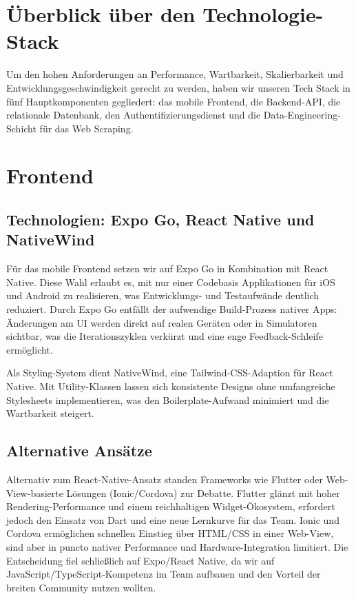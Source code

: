 \documentclass[12pt, a4paper]{report} %
\begin{document}
\section{Überblick über den Technologie-Stack}
Um den hohen Anforderungen an Performance, Wartbarkeit, Skalierbarkeit und Entwicklungsgeschwindigkeit gerecht zu werden, haben wir unseren Tech Stack in fünf Hauptkomponenten gegliedert: das mobile Frontend, die Backend-API, die relationale Datenbank, den Authentifizierungsdienst und die Data-Engineering-Schicht für das Web Scraping.

\section{Frontend}
\subsection{Technologien: Expo Go, React Native und NativeWind}
Für das mobile Frontend setzen wir auf Expo Go in Kombination mit React Native. Diese Wahl erlaubt es, mit nur einer Codebasis Applikationen für iOS und Android zu realisieren, was Entwicklungs- und Testaufwände deutlich reduziert. Durch Expo Go entfällt der aufwendige Build-Prozess nativer Apps: Änderungen am UI werden direkt auf realen Geräten oder in Simulatoren sichtbar, was die Iterationszyklen verkürzt und eine enge Feedback-Schleife ermöglicht.

Als Styling-System dient NativeWind, eine Tailwind-CSS-Adaption für React Native. Mit Utility-Klassen lassen sich konsistente Designs ohne umfangreiche Stylesheets implementieren, was den Boilerplate-Aufwand minimiert und die Wartbarkeit steigert.

\subsection{Alternative Ansätze}
Alternativ zum React-Native-Ansatz standen Frameworks wie Flutter oder Web-View-basierte Lösungen (Ionic/Cordova) zur Debatte. Flutter glänzt mit hoher Rendering-Performance und einem reichhaltigen Widget-Ökosystem, erfordert jedoch den Einsatz von Dart und eine neue Lernkurve für das Team. Ionic und Cordova ermöglichen schnellen Einstieg über HTML/CSS in einer Web-View, sind aber in puncto nativer Performance und Hardware-Integration limitiert. Die Entscheidung fiel schließlich auf Expo/React Native, da wir auf JavaScript/TypeScript-Kompetenz im Team aufbauen und den Vorteil der breiten Community nutzen wollten.
\end{document}
